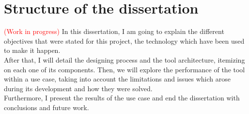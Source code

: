 \documentclass[a4paper, 12pt]{book}
\begin{document}
\section{Structure of the dissertation}
\label{sec:structure}
\textcolor{red}{(Work in progress)}\newline
In this dissertation, I am going to explain the different objectives that were stated for this project, the technology
which have been used to make it happen.\\
After that, I will detail the designing process and the tool architecture, itemizing on each one of its components. Then,
we will explore the performance of the tool within a use case, taking into account the limitations and issues which arose
during its development and how they were solved.\\Furthermore, I present the results of the use case and end the dissertation
with conclusions and future work.
\cleardoublepage
\end{document}
